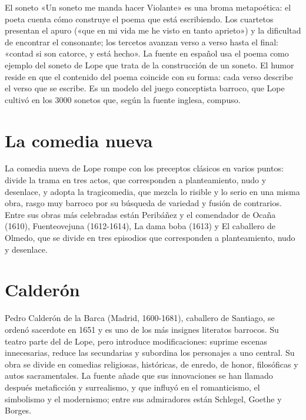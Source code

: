 \documentclass{book}
\begin{document}
El soneto «Un soneto me manda hacer Violante» es una broma metapoética: el poeta cuenta cómo construye el poema que está escribiendo. Los cuartetos presentan el apuro («que en mi vida me he visto en tanto aprieto») y la dificultad de encontrar el consonante; los tercetos avanzan verso a verso hasta el final: «contad si son catorce, y está hecho». La fuente en español usa el poema como ejemplo del soneto de Lope que trata de la construcción de un soneto. El humor reside en que el contenido del poema coincide con su forma: cada verso describe el verso que se escribe. Es un modelo del juego conceptista barroco, que Lope cultivó en los 3000 sonetos que, según la fuente inglesa, compuso.


\section{La comedia nueva}

La comedia nueva de Lope rompe con los preceptos clásicos en varios puntos: divide la trama en tres actos, que corresponden a planteamiento, nudo y desenlace, y adopta la tragicomedia, que mezcla lo risible y lo serio en una misma obra, rasgo muy barroco por su búsqueda de variedad y fusión de contrarios. Entre sus obras más celebradas están Peribáñez y el comendador de Ocaña (1610), Fuenteovejuna (1612-1614), La dama boba (1613) y El caballero de Olmedo, que se divide en tres episodios que corresponden a planteamiento, nudo y desenlace.


\section{Calderón}

Pedro Calderón de la Barca (Madrid, 1600-1681), caballero de Santiago, se ordenó sacerdote en 1651 y es uno de los más insignes literatos barrocos. Su teatro parte del de Lope, pero introduce modificaciones: suprime escenas innecesarias, reduce las secundarias y subordina los personajes a uno central. Su obra se divide en comedias religiosas, históricas, de enredo, de honor, filosóficas y autos sacramentales. La fuente añade que sus innovaciones se han llamado después metaficción y surrealismo, y que influyó en el romanticismo, el simbolismo y el modernismo; entre sus admiradores están Schlegel, Goethe y Borges.
\end{document}

